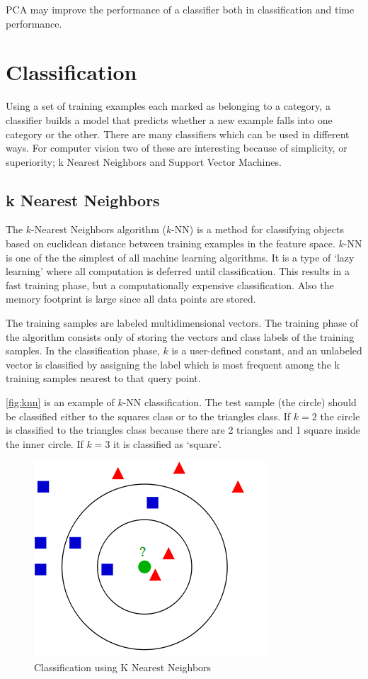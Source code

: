 PCA may improve the performance of a classifier both in classification and time performance.

\section{Classification}
Using a set of training examples each marked as belonging to a category, a classifier builds a model that predicts whether a new example falls into one category or the other. There are many classifiers which can be used in different ways. For computer vision two of these are interesting because of simplicity, or superiority; k Nearest Neighbors and Support Vector Machines.

\subsection*{k Nearest Neighbors}
The $k$-Nearest Neighbors algorithm ($k$-NN) is a method for classifying objects based on euclidean distance between training examples in the feature space. $k$-NN is one of the the simplest of all machine learning  algorithms. It is a type of `lazy learning' where all computation is deferred until classification. This results in a fast training phase, but a computationally expensive classification. Also the memory footprint is large since all data points are stored. 

The training samples are labeled multidimensional vectors. The training phase of the algorithm consists only of storing the vectors and class labels of the training samples. In the classification phase, $k$ is a user-defined constant, and an unlabeled vector is classified by assigning the label which is most frequent among the k training samples nearest to that query point.

\autoref{fig:knn} is an example of $k$-NN classification. The test sample (the circle) should be classified either to the squares class or to the triangles class. If $k = 2$ the circle is classified to the triangles class because there are 2 triangles and 1 square inside the inner circle. If $k = 3$ it is classified as `square'.

\begin{figure}[tb]
\center{}
\includegraphics[width=0.5\linewidth]{figures/knn.png}
\caption{Classification using K Nearest Neighbors}
\label{fig:knn}
\end{figure}




